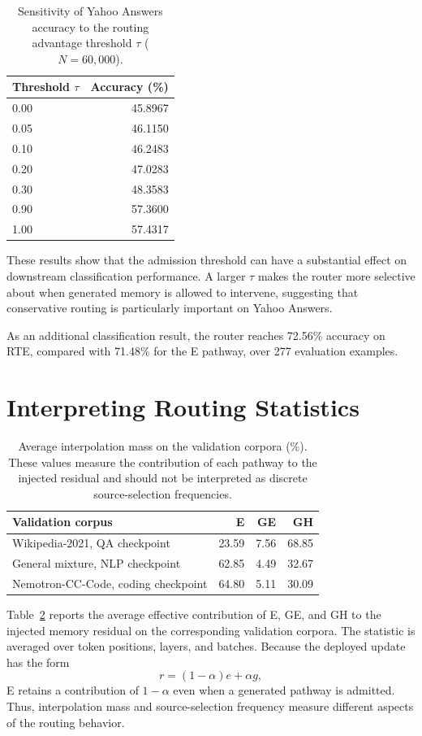 \begin{table}[h]
\centering
\caption{
Sensitivity of Yahoo Answers accuracy to the routing advantage threshold
$\tau$ ($N=60{,}000$).
}
\label{tab:yahoo-threshold}
\begin{tabular}{lr}
\toprule
Threshold $\tau$ & Accuracy (\%)\\
\midrule
0.00 & 45.8967\\
0.05 & 46.1150\\
0.10 & 46.2483\\
0.20 & 47.0283\\
0.30 & 48.3583\\
0.90 & 57.3600\\
1.00 & 57.4317\\
\bottomrule
\end{tabular}
\end{table}

These results show that the admission threshold can have a substantial effect
on downstream classification performance. A larger $\tau$ makes the router
more selective about when generated memory is allowed to intervene, suggesting
that conservative routing is particularly important on Yahoo Answers.

As an additional classification result, the router reaches 72.56\% accuracy on
RTE, compared with 71.48\% for the E pathway, over 277 evaluation examples.
\section{Interpreting Routing Statistics}
\label{app:routing}

\begin{table}[h]
\centering
\caption{
Average interpolation mass on the validation corpora (\%). These values measure
the contribution of each pathway to the injected residual and should not be
interpreted as discrete source-selection frequencies.
}
\label{tab:routing-stats}
\begin{tabular}{lrrr}
\toprule
Validation corpus & E & GE & GH\\
\midrule
Wikipedia-2021, QA checkpoint & 23.59 & 7.56 & 68.85\\
General mixture, NLP checkpoint & 62.85 & 4.49 & 32.67\\
Nemotron-CC-Code, coding checkpoint & 64.80 & 5.11 & 30.09\\
\bottomrule
\end{tabular}
\end{table}

Table~\ref{tab:routing-stats} reports the average effective contribution of
E, GE, and GH to the injected memory residual on the corresponding validation
corpora. The statistic is averaged over token positions, layers, and batches.
Because the deployed update has the form
\[
r=(1-\alpha)e+\alpha g,
\]
E retains a contribution of $1-\alpha$ even when a generated pathway is
admitted. Thus, interpolation mass and source-selection frequency measure
different aspects of the routing behavior.


